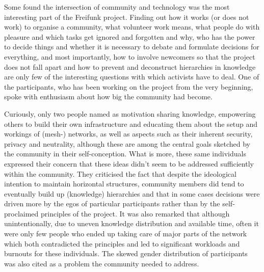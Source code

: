 Some found the intersection of community and technology was the most interesting part of the Freifunk project.
Finding out how it works (or does not work) to organise a community, what volunteer work means, what people do with pleasure and which tasks get ignored and forgotten and why, who has the power to decide things and whether it is necessary to debate and formulate decisions for everything, and most importantly, how to involve newcomers so that the project does not fall apart and how to prevent and deconstruct hierarchies in knowledge are only few of the interesting questions with which activists have to deal.
One of the participants, who has been working on the project from the very beginning, spoke with enthusiasm about how big the community had become.

Curiously, only two people named as motivation sharing knowledge, empowering others to build their own infrastructure and educating them about the setup and workings of (mesh-) networks, as well as aspects such as their inherent security, privacy and neutrality, although these are among the central goals sketched by the community in their self-conception\cite{ffweb}.
What is more, these same individuals expressed their concern that these ideas didn't seem to be addressed sufficiently within the community.
They criticised the fact that despite the ideological intention to maintain horizontal structures, community members did tend to eventually build up (knowledge) hierarchies and that in some cases decisions were driven more by the egos of particular participants rather than by the self-proclaimed principles of the project.
It was also remarked that although unintentionally, due to uneven knowledge distribution and available time, often it were only few people who ended up taking care of major parts of the network which both contradicted the principles and led to significant workloads and burnouts for these individuals.
The skewed gender distribution of participants was also cited as a problem the community needed to address.

\begin{comment}
Many of the interviewed only started to actively participate in Freifunk after attending some kind of event: be it a local community meeting, meeting activists at the Chaos Communication Congress or other kinds of conferences.
\end{comment}

